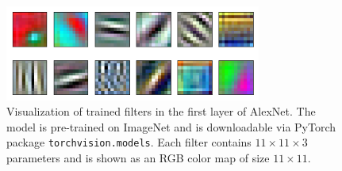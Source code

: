 %
%
%
\begin{figure}
\centering
\includegraphics[width = 0.75\textwidth]{ImagnetFilterVisualization2by6}
\caption{Visualization of trained filters in the first layer of AlexNet. The model is pre-trained on ImageNet and is downloadable via PyTorch package \texttt{torchvision.models}. Each filter contains $11 \times 11 \times 3$ parameters and is shown as an RGB color map of size $11 \times 11$.}\label{fig:vis}
\end{figure}
